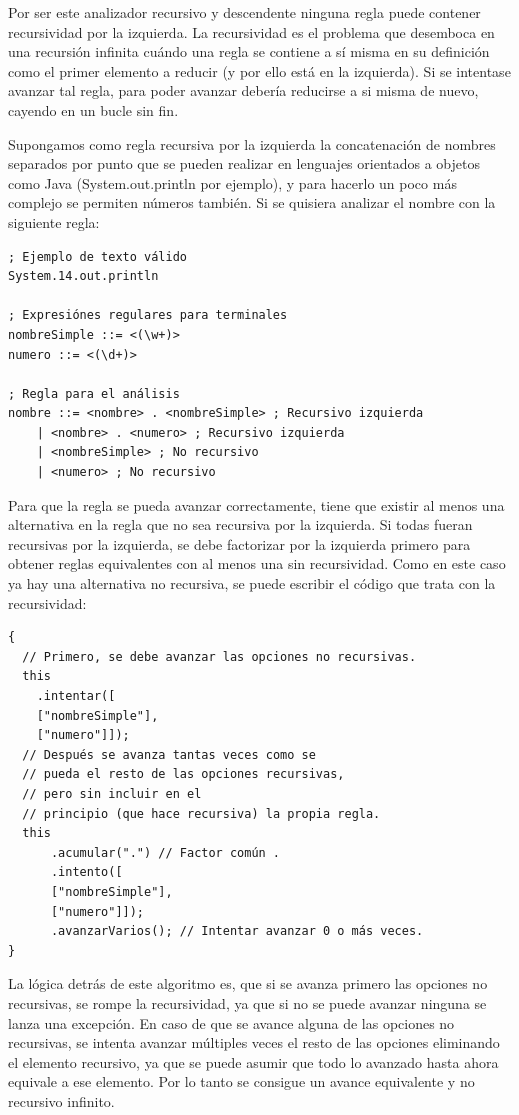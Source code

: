 \documentclass{report}
\begin{document}
	Por ser este analizador recursivo y descendente ninguna regla puede contener recursividad por la izquierda. La recursividad es el problema que desemboca en una recursión infinita cuándo una regla se contiene a sí misma en su definición como el primer elemento a reducir (y por ello está en la izquierda). Si se intentase avanzar tal regla, para poder avanzar debería reducirse a si misma de nuevo, cayendo en un bucle sin fin.
	
	Supongamos como regla recursiva por la izquierda la concatenación de nombres separados por punto que se pueden realizar en lenguajes orientados a objetos como Java (System.out.println por ejemplo), y para hacerlo un poco más complejo se permiten números también. Si se quisiera analizar el nombre con la siguiente regla:
	
	
\begin{BVerbatim}
; Ejemplo de texto válido 
System.14.out.println

; Expresiónes regulares para terminales
nombreSimple ::= <(\w+)>
numero ::= <(\d+)>

; Regla para el análisis
nombre ::= <nombre> . <nombreSimple> ; Recursivo izquierda
	| <nombre> . <numero> ; Recursivo izquierda
	| <nombreSimple> ; No recursivo
	| <numero> ; No recursivo
\end{BVerbatim}	

	Para que la regla se pueda avanzar correctamente, tiene que existir al menos una alternativa en la regla que no sea recursiva por la izquierda. Si todas fueran recursivas por la izquierda, se debe factorizar por la izquierda primero para obtener reglas equivalentes con al menos una sin recursividad\cite{conflictoll3}. Como en este caso ya hay una alternativa no recursiva, se puede escribir el código que trata con la recursividad:
	
\begin{BVerbatim}
{
  // Primero, se debe avanzar las opciones no recursivas.
  this
    .intentar([
    ["nombreSimple"],
    ["numero"]]);
  // Después se avanza tantas veces como se 
  // pueda el resto de las opciones recursivas,
  // pero sin incluir en el 
  // principio (que hace recursiva) la propia regla.
  this
	  .acumular(".") // Factor común .
	  .intento([
	  ["nombreSimple"],
	  ["numero"]]);
	  .avanzarVarios(); // Intentar avanzar 0 o más veces.
}
\end{BVerbatim}

	\vspace{10px}

	La lógica detrás de este algoritmo es, que si se avanza primero las opciones no recursivas, se rompe la recursividad, ya que si no se puede avanzar ninguna se lanza una excepción. En caso de que se avance alguna de las opciones no recursivas, se intenta avanzar múltiples veces el resto de las opciones eliminando el elemento recursivo, ya que se puede asumir que todo lo avanzado hasta ahora equivale a ese elemento. Por lo tanto se consigue un avance equivalente y no recursivo infinito. 
	
\end{document}
